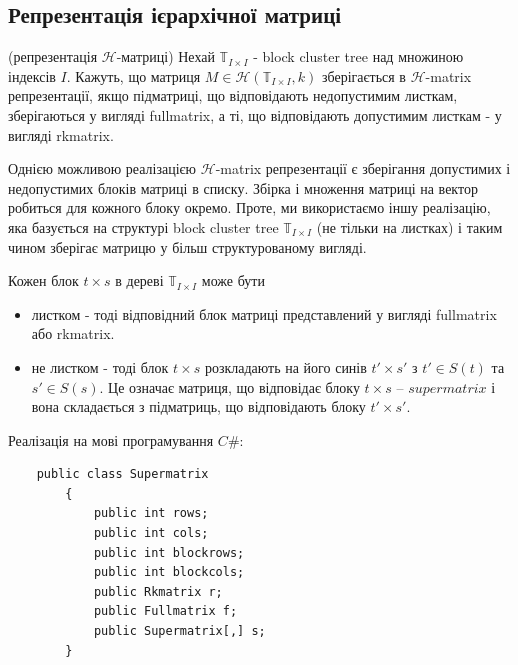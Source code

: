 \documentclass[12pt]{report}
\begin{document}
	\subsection{Репрезентація ієрархічної матриці}
	\begin{Def}
		(репрезентація $\mathcal{H}$-матриці)  Нехай $\mathbb{T}_{I\times I}$ - block cluster tree над множиною індексів $I$. Кажуть, що матриця $M\in\mathcal{H}(\mathbb{T}_{I\times I},k)$ зберігається в $\mathcal{H}$-matrix репрезентації, якщо підматриці, що відповідають недопустимим листкам, зберігаються у вигляді fullmatrix, а ті, що відповідають допустимим листкам - у вигляді rkmatrix. 
	\end{Def}
	\par Однією можливою реалізацією $\mathcal{H}$-matrix репрезентації є зберігання допустимих і недопустимих блоків матриці в списку. Збірка і множення матриці на вектор робиться для кожного блоку окремо. Проте, ми використаємо іншу реалізацію, яка базується на структурі block cluster tree $\mathbb{T}_{I\times I}$ (не тільки на листках) і таким чином зберігає матрицю у більш структурованому вигляді.
	\par Кожен блок $t\times s$ в дереві $\mathbb{T}_{I\times I}$ може бути 
	\begin{itemize}
		\item листком - тоді відповідний блок матриці представлений у вигляді fullmatrix або rkmatrix.
		\item не листком - тоді блок $t\times s$ розкладають на його синів $t'\times s'$ з $t'\in S(t)$ та $s' \in S(s)$. Це означає матриця, що відповідає блоку $t\times s$ -- $supermatrix$ і вона складається з підматриць, що відповідають блоку $t'\times s'$.
	\end{itemize} 
	\par Реалізація на мові програмування $C\#$:
	\begin{verbatim}
	public class Supermatrix
	    {
	        public int rows;
	        public int cols;
	        public int blockrows;
	        public int blockcols;
	        public Rkmatrix r;
	        public Fullmatrix f;
	        public Supermatrix[,] s;
	    }
	\end{verbatim}
\end{document}
